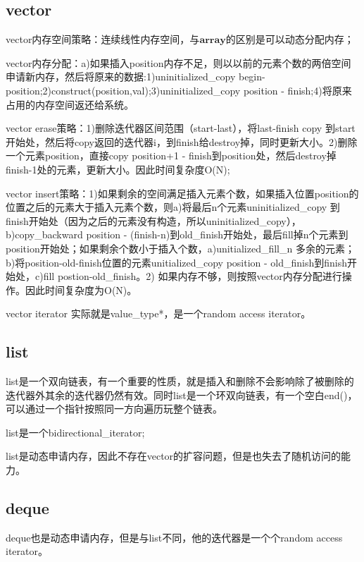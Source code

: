 \documentclass[a4paper,fontset=mac]{ctexart}
\begin{document}
	\subsection{vector}
	vector内存空间策略：{\color{red}连续线性}内存空间，与$\boldsymbol{array}$的区别是可以{\color{red}动态分配}内存；
	
	vector内存分配：a)如果插入position内存不足，则以以前的{\color{red}元素个数的两倍空间}申请新内存，然后将原来的数据:1)uninitialized\_copy  begin-position;2)construct(position,val);3)uninitialized\_copy position - finish;4)将原来占用的内存空间返还给系统。
	
	vector erase策略：1)删除迭代器区间范围（start-last），将last-finish copy 到start开始处，然后将copy返回的迭代器i，到finish给destroy掉，同时更新大小。2)删除一个元素position，直接copy position+1 - finish到position处，然后destroy掉finish-1处的元素，更新大小。因此时间复杂度{\color{red}O(N)};
	
	vector insert策略：1)如果剩余的空间满足插入元素个数，如果插入位置position的位置之后的元素大于插入元素个数，则a)将最后n个元素uninitialized\_copy 到finish开始处（因为之后的元素没有构造，所以uninitialized\_copy），b)copy\_backward position - (finish-n)到old\_finish开始处，最后fill掉n个元素到position开始处；如果剩余个数小于插入个数，a)unitialized\_fill\_n 多余的元素；b)将position-old-finish位置的元素unitialized\_copy position - old\_finish到finish开始处，c)fill postion-old\_finish。2) 如果内存不够，则按照vector内存分配进行操作。因此时间复杂度为{\color{red}O(N)}。
	
	vector iterator 实际就是{\color{red}value\_type*}，是一个random access iterator。
	
	
	\subsection{list}
	list是一个双向链表，有一个重要的性质，就是{\color{red}插入和删除不会影响除了被删除的迭代器外其余的迭代器仍然有效}。同时list是一个环双向链表，有一个空白end()，可以通过一个指针按照同一方向遍历玩整个链表。
	
	list是一个bidirectional\_iterator;
	
	list是动态申请内存，因此不存在vector的扩容问题，但是也失去了随机访问的能力。
	
	\subsection{deque}
	deque也是动态申请内存，但是与list不同，他的迭代器是一个个random access iterator。
	
\end{document}
